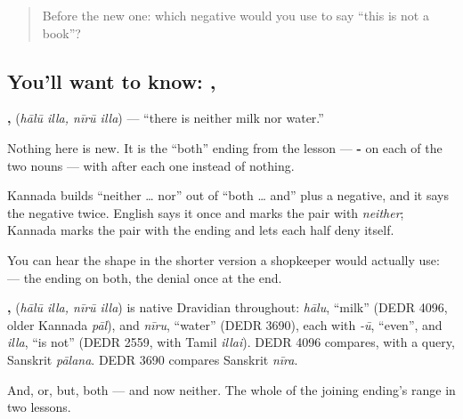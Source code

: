 \label{lesson:KA-C68-neither}



\begin{quote}
Before the new one: which negative would you use to say \textquotedblleft{}this is not a book\textquotedblright{}?
\end{quote}

\subsection*{You'll want to know:  ,  }
\textbf{ ,  } (\emph{hālū illa, nīrū illa}) — \textquotedblleft{}there is neither milk nor water.\textquotedblright{}

Nothing here is new. It is the \textquotedblleft{}both\textquotedblright{} ending from the  lesson — \textbf{-} on each of the two nouns — with  after each one instead of nothing.

Kannada builds \textquotedblleft{}neither … nor\textquotedblright{} out of \textquotedblleft{}both … and\textquotedblright{} plus a negative, and it says the negative twice. English says it once and marks the pair with \emph{neither}; Kannada marks the pair with the ending and lets each half deny itself.

You can hear the shape in the shorter version a shopkeeper would actually use: \textbf{  } — the ending on both, the denial once at the end.

\begin{cousinweb}
\textbf{ ,  } (\emph{hālū illa, nīrū illa}) is native Dravidian throughout: \emph{hālu}, \textquotedblleft{}milk\textquotedblright{} (DEDR 4096, older Kannada \emph{pāl}), and \emph{nīru}, \textquotedblleft{}water\textquotedblright{} (DEDR 3690), each with \emph{-ū}, \textquotedblleft{}even\textquotedblright{}, and \emph{illa}, \textquotedblleft{}is not\textquotedblright{} (DEDR 2559, with Tamil \emph{illai}). DEDR 4096 compares, with a query, Sanskrit \emph{pālana}. DEDR 3690 compares Sanskrit \emph{nīra}.
\end{cousinweb}

\begin{grammarlens}[title={What you've built}]
And, or, but, both — and now neither. The whole of the joining ending's range in two lessons.
\end{grammarlens}

